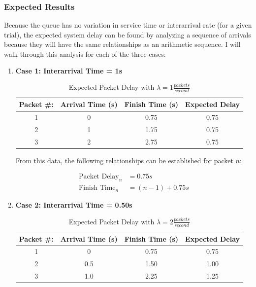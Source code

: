\documentclass{article}
\begin{document}
\subsubsection*{Expected Results}
\label{sec:expectation}
Because the queue has no variation in service time or interarrival rate (for a given trial), the expected system delay can be found by analyzing a sequence of arrivals because they will have the same relationships as an arithmetic sequence.
I will walk through this analysis for each of the three cases:
\begin{enumerate}
	\item[] \textbf{Case 1:  Interarrival Time = 1s}
	
	\begin{table}[h!]
		\centering
		\begin{tabular}{|c|c|c|c|} \hline
		\textbf{Packet \#:} & \textbf{Arrival Time (s)} & \textbf{Finish Time (s)} & \textbf{Expected Delay} \\ \hline
		1 & 0 & 0.75 & 0.75 \\ \hline
		2 & 1 & 1.75 & 0.75 \\ \hline
		3 & 2 & 2.75 & 0.75 \\ \hline
		\end{tabular}
		\caption{Expected Packet Delay with $\lambda = 1 \frac{packets}{second}$}
		\label{Case1_Delay}
	\end{table}

From this data, the following relationships can be established for packet $n$:

\begin{align*}
\text{Packet Delay}_n &= 0.75s \\
\text{Finish Time}_{n} &= (n - 1) + 0.75s
\end{align*}

	\item[] \textbf{Case 2:  Interarrival Time = 0.50s}

	\begin{table}[h!]
		\centering
		\begin{tabular}{|c|c|c|c|} \hline
		\textbf{Packet \#:} & \textbf{Arrival Time (s)} & \textbf{Finish Time (s)} & \textbf{Expected Delay} \\ \hline
		1 & 0 & 0.75 & 0.75 \\ \hline
		2 & 0.5 & 1.50 & 1.00 \\ \hline
		3 & 1.0 & 2.25 & 1.25 \\ \hline
		\end{tabular}
		\caption{Expected Packet Delay with $\lambda = 2 \frac{packets}{second}$}
		\label{Case2_Delay}
	\end{table}


\end{enumerate}
\end{document}
